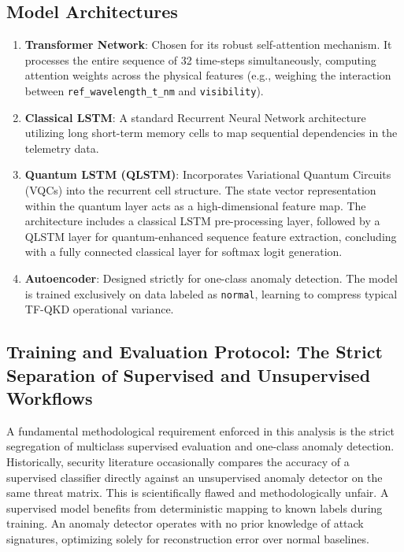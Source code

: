 \documentclass[conference]{IEEEtran}
\begin{document}
\subsection{Model Architectures}
\begin{enumerate}
    \item \textbf{Transformer Network}: Chosen for its robust self-attention mechanism. It processes the entire sequence of 32 time-steps simultaneously, computing attention weights across the physical features (e.g., weighing the interaction between \texttt{ref\_wavelength\_t\_nm} and \texttt{visibility}). 
    \item \textbf{Classical LSTM}: A standard Recurrent Neural Network architecture utilizing long short-term memory cells to map sequential dependencies in the telemetry data.
    \item \textbf{Quantum LSTM (QLSTM)}: Incorporates Variational Quantum Circuits (VQCs) into the recurrent cell structure. The state vector representation within the quantum layer acts as a high-dimensional feature map. The architecture includes a classical LSTM pre-processing layer, followed by a QLSTM layer for quantum-enhanced sequence feature extraction, concluding with a fully connected classical layer for softmax logit generation.
    \item \textbf{Autoencoder}: Designed strictly for one-class anomaly detection. The model is trained exclusively on data labeled as \texttt{normal}, learning to compress typical TF-QKD operational variance.
\end{enumerate}

\subsection{Training and Evaluation Protocol: The Strict Separation of Supervised and Unsupervised Workflows}
A fundamental methodological requirement enforced in this analysis is the strict segregation of multiclass supervised evaluation and one-class anomaly detection. Historically, security literature occasionally compares the accuracy of a supervised classifier directly against an unsupervised anomaly detector on the same threat matrix. This is scientifically flawed and methodologically unfair. A supervised model benefits from deterministic mapping to known labels during training. An anomaly detector operates with no prior knowledge of attack signatures, optimizing solely for reconstruction error over normal baselines.
\end{document}
